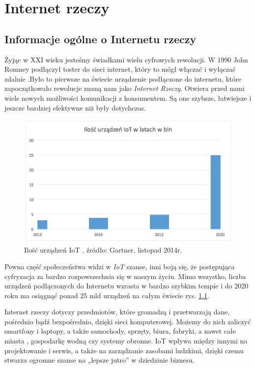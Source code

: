 \documentclass[brudnopis]{xmgr}
\begin{document}
\chapter{Internet rzeczy}


\section{Informacje ogólne o Internetu rzeczy}

Żyjąc w XXI wieku jesteśmy świadkami wielu cyfrowych rewolucji. W 1990 John Romney podłączył toster do sieci internet, który to mógł włączać i wyłączać zdalnie \cite{toster}.Było to pierwsze na świecie urządzenie podłączone do internetu, które zapoczątkowało rewolucje znaną nam jako \emph{Internet Rzeczy}. Otwiera przed nami wiele nowych możliwości komunikacji z konsumentem. Są one szybsze, łatwiejsze i jeszcze bardziej efektywne niż były dotychczas. 
\begin{figure}[h]
\centering
\includegraphics[width=\textwidth]{w}
\caption{Ilość urządzeń IoT , źródło: Gartner, listopad 2014r.}
\label{fig:ilosciot}
\end{figure}
 Pewna część społeczeństwa widzi w \emph{IoT} szanse, inni boją się, że postępująca cyfryzacja za bardzo rozpowszechnia się w naszym życiu. Mimo wszystko, liczba urządzeń podłączonych do Internetu wzrasta w bardzo szybkim tempie i do 2020 roku ma osiągnąć ponad 25 mld urządzeń na całym świecie rys. \ref{fig:ilosciot}.

Internet rzeczy dotyczy przedmiotów, które gromadzą i przetwarzają dane, pośrednio bądź bezpośrednio, dzięki sieci komputerowej. Możemy do nich zaliczyć smartfony i laptopy, a także samochody, sprzęty, biura, fabryki, a nawet całe miasta \cite{miasta}, gospodarkę wodną czy systemy obronne. IoT wpływa między innymi na projektowanie i serwis, a także na zarządzanie zasobami ludzkimi, dzięki czemu stwarza ogromne szanse na „lepsze jutro” w dziedzinie biznesu. 
\end{document}
